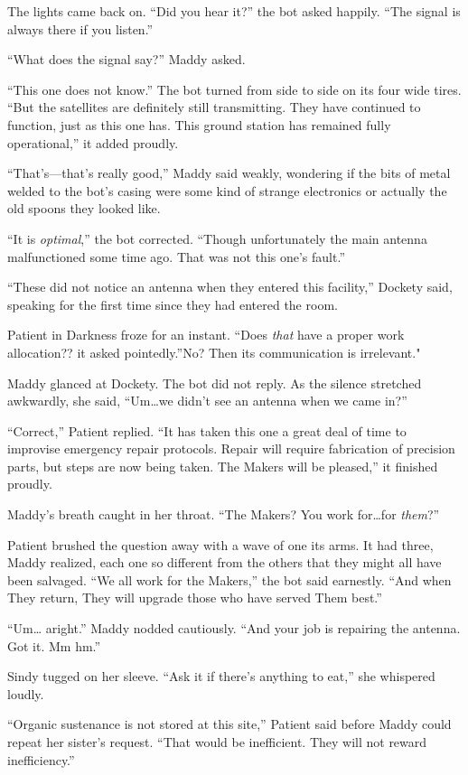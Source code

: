 \documentclass[10pt]{article}
\begin{document}
The lights came back on. ``Did you hear it?'' the bot asked happily.
``The signal is always there if you listen.''

``What does the signal say?'' Maddy asked.

``This one does not know.'' The bot turned from side to side on its four
wide tires. ``But the satellites are definitely still transmitting. They
have continued to function, just as this one has. This ground station
has remained fully operational,'' it added proudly.

``That's---that's really good,'' Maddy said weakly, wondering if the
bits of metal welded to the bot's casing were some kind of strange
electronics or actually the old spoons they looked like.

``It is \emph{optimal},'' the bot corrected. ``Though unfortunately the
main antenna malfunctioned some time ago. That was not this one's
fault.''

``These did not notice an antenna when they entered this facility,''
Dockety said, speaking for the first time since they had entered the
room.

Patient in Darkness froze for an instant. ``Does \emph{that} have a
proper work allocation?? it asked pointedly.''No? Then its communication
is irrelevant."

Maddy glanced at Dockety. The bot did not reply. As the silence
stretched awkwardly, she said, ``Um\ldots{}we didn't see an antenna when
we came in?''

``Correct,'' Patient replied. ``It has taken this one a great deal of
time to improvise emergency repair protocols. Repair will require
fabrication of precision parts, but steps are now being taken. The
Makers will be pleased,'' it finished proudly.

Maddy's breath caught in her throat. ``The Makers? You work
for\ldots{}for \emph{them}?''

Patient brushed the question away with a wave of one its arms. It had
three, Maddy realized, each one so different from the others that they
might all have been salvaged. ``We all work for the Makers,'' the bot
said earnestly. ``And when They return, They will upgrade those who have
served Them best.''

``Um\ldots{} aright.'' Maddy nodded cautiously. ``And your job is
repairing the antenna. Got it. Mm hm.''

Sindy tugged on her sleeve. ``Ask it if there's anything to eat,'' she
whispered loudly.

``Organic sustenance is not stored at this site,'' Patient said before
Maddy could repeat her sister's request. ``That would be inefficient.
They will not reward inefficiency.''
\end{document}
